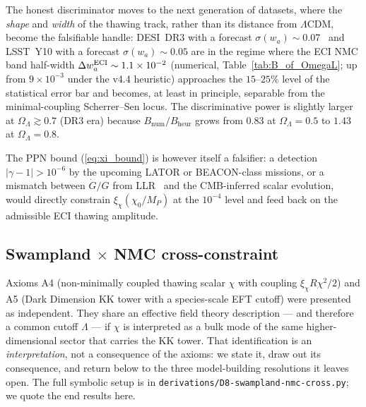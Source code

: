 \documentclass[epjc3,twocolumn]{svjour3}
\begin{document}
\begin{enumerate}
  The honest discriminator moves to the next generation of datasets, where the
  \emph{shape} and \emph{width} of the thawing track, rather than its distance from
  $\Lambda$CDM, become the falsifiable handle: DESI~DR3 with a forecast
  $\sigma(w_a)\!\sim\!0.07$~\cite{DESIForecast}
  and LSST~Y10 with a forecast $\sigma(w_a)\!\sim\!0.05$
  are in the regime where the ECI NMC band half-width
  $\Delta w_a^{\rm ECI}\sim 1.1\times 10^{-2}$ (numerical, Table~\ref{tab:B_of_OmegaL};
  up from $9\times 10^{-3}$ under the v4.4 heuristic) approaches the
  $15$--$25\%$ level of the statistical error bar and becomes, at least in principle,
  separable from the minimal-coupling Scherrer--Sen locus. The discriminative
  power is slightly larger at $\Omega_\Lambda\gtrsim 0.7$ (DR3 era) because
  $B_{\mathrm{num}}/B_{\mathrm{heur}}$ grows from $0.83$ at $\Omega_\Lambda=0.5$ to
  $1.43$ at $\Omega_\Lambda=0.8$.
\end{enumerate}

The PPN bound (\ref{eq:xi_bound}) is however itself a falsifier: a detection
$|\gamma-1|>10^{-6}$ by the upcoming LATOR or BEACON-class missions, or a mismatch between
$\dot G/G$ from LLR~\cite{Biskupek2021} and the CMB-inferred scalar evolution, would directly
constrain $\xi_\chi(\chi_0/M_P)$ at the $10^{-4}$ level and feed back on the admissible ECI
thawing amplitude.


\subsection{Swampland $\times$ NMC cross-constraint}\label{sec:swampland_cross}

Axioms A4 (non-minimally coupled thawing scalar $\chi$ with coupling
$\xi_\chi R\chi^2/2$) and A5 (Dark Dimension KK tower with a species-scale
EFT cutoff) were presented as independent. They share an effective field
theory description --- and therefore a common cutoff $\Lambda$ --- if $\chi$
is interpreted as a bulk mode of the same higher-dimensional sector that
carries the KK tower. That identification is an \emph{interpretation}, not
a consequence of the axioms: we state it, draw out its consequence, and
return below to the three model-building resolutions it leaves open.
The full symbolic setup is in \texttt{derivations/D8-swampland-nmc-cross.py};
we quote the end results here.
\end{document}
